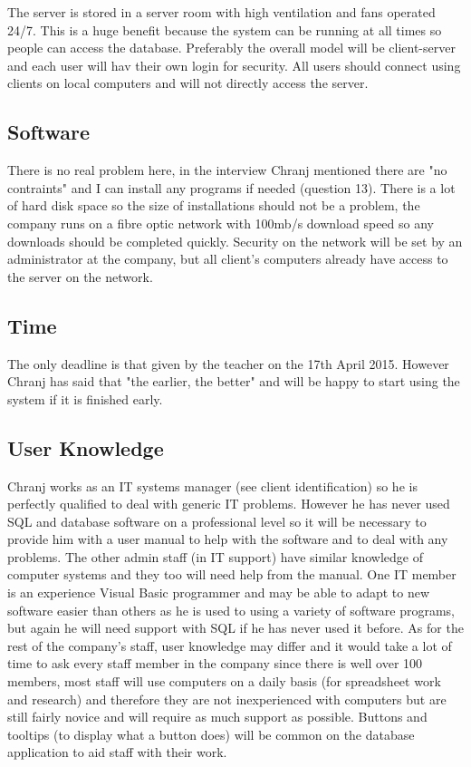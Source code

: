 The server is stored in a server room with high ventilation and fans operated 24/7. This is a huge benefit because the system can be running at all times so people can access the database. Preferably the overall model will be client-server and each user will hav their own login for security. All users should connect using clients on local computers and will not directly access the server.

\subsection{Software}

There is no real problem here, in the interview Chranj mentioned there are "no contraints" and I can install any programs if needed (question 13). There is a lot of hard disk space so the size of installations should not be a problem, the company runs on a fibre optic network with 100mb/s download speed so any downloads should be completed quickly. Security on the network will be set by an administrator at the company, but all client's computers already have access to the server on the network.

\subsection{Time}

The only deadline is that given by the teacher on the 17th April 2015. However Chranj has said that "the earlier, the better" and will be happy to start using the system if it is finished early.

\subsection{User Knowledge}

Chranj works as an IT systems manager (see client identification) so he is perfectly qualified to deal with generic IT problems. However he has never used SQL and database software on a professional level so it will be necessary to provide him with a user manual to help with the software and to deal with any problems. The other admin staff (in IT support) have similar knowledge of computer systems and they too will need help from the manual. One IT member is an experience Visual Basic programmer and may be able to adapt to new software easier than others as he is used to using a variety of software programs, but again he will need support with SQL if he has never used it before. As for the rest of the company's staff, user knowledge may differ and it would take a lot of time to ask every staff member in the company since there is well over 100 members, most staff will use computers on a daily basis (for spreadsheet work and research) and therefore they are not inexperienced with computers but are still fairly novice and will require as much support as possible. Buttons and tooltips (to display what a button does) will be common on the database application to aid staff with their work.

